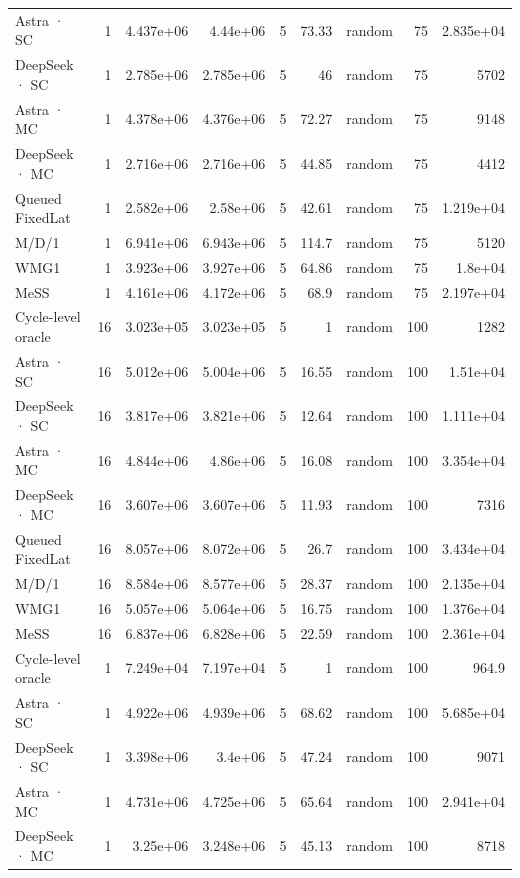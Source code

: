 \begin{tabular}{lrrrrrlrr}
Astra · SC & 1 & 4.437e+06 & 4.44e+06 & 5 & 73.33 & random & 75 & 2.835e+04 \\
DeepSeek · SC & 1 & 2.785e+06 & 2.785e+06 & 5 & 46 & random & 75 & 5702 \\
Astra · MC & 1 & 4.378e+06 & 4.376e+06 & 5 & 72.27 & random & 75 & 9148 \\
DeepSeek · MC & 1 & 2.716e+06 & 2.716e+06 & 5 & 44.85 & random & 75 & 4412 \\
Queued FixedLat & 1 & 2.582e+06 & 2.58e+06 & 5 & 42.61 & random & 75 & 1.219e+04 \\
M/D/1 & 1 & 6.941e+06 & 6.943e+06 & 5 & 114.7 & random & 75 & 5120 \\
WMG1 & 1 & 3.923e+06 & 3.927e+06 & 5 & 64.86 & random & 75 & 1.8e+04 \\
MeSS & 1 & 4.161e+06 & 4.172e+06 & 5 & 68.9 & random & 75 & 2.197e+04 \\
Cycle-level oracle & 16 & 3.023e+05 & 3.023e+05 & 5 & 1 & random & 100 & 1282 \\
Astra · SC & 16 & 5.012e+06 & 5.004e+06 & 5 & 16.55 & random & 100 & 1.51e+04 \\
DeepSeek · SC & 16 & 3.817e+06 & 3.821e+06 & 5 & 12.64 & random & 100 & 1.111e+04 \\
Astra · MC & 16 & 4.844e+06 & 4.86e+06 & 5 & 16.08 & random & 100 & 3.354e+04 \\
DeepSeek · MC & 16 & 3.607e+06 & 3.607e+06 & 5 & 11.93 & random & 100 & 7316 \\
Queued FixedLat & 16 & 8.057e+06 & 8.072e+06 & 5 & 26.7 & random & 100 & 3.434e+04 \\
M/D/1 & 16 & 8.584e+06 & 8.577e+06 & 5 & 28.37 & random & 100 & 2.135e+04 \\
WMG1 & 16 & 5.057e+06 & 5.064e+06 & 5 & 16.75 & random & 100 & 1.376e+04 \\
MeSS & 16 & 6.837e+06 & 6.828e+06 & 5 & 22.59 & random & 100 & 2.361e+04 \\
Cycle-level oracle & 1 & 7.249e+04 & 7.197e+04 & 5 & 1 & random & 100 & 964.9 \\
Astra · SC & 1 & 4.922e+06 & 4.939e+06 & 5 & 68.62 & random & 100 & 5.685e+04 \\
DeepSeek · SC & 1 & 3.398e+06 & 3.4e+06 & 5 & 47.24 & random & 100 & 9071 \\
Astra · MC & 1 & 4.731e+06 & 4.725e+06 & 5 & 65.64 & random & 100 & 2.941e+04 \\
DeepSeek · MC & 1 & 3.25e+06 & 3.248e+06 & 5 & 45.13 & random & 100 & 8718 \\

\end{tabular}
